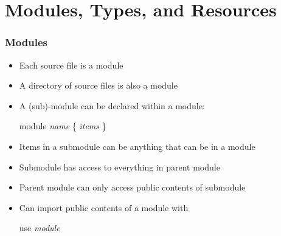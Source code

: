 \documentclass[12pt]{beamer}
\begin{document}
\section{Modules, Types, and Resources}

\begin{frame}[fragile]
\frametitle{Modules}
\begin{itemize}
\item Each source file is a module
\item A directory of source files is also a module
\item A (sub)-module can be declared within a module: \\[-1ex]
  \begin{minipage}{0.95\linewidth}
    \begin{block}{}
\begin{semiverbatim}
module \emph{name} \{
    \emph{items}
\}
\end{semiverbatim}
    \end{block}
  \end{minipage}
\item Items in a submodule can be anything that can be in a module
\item Submodule has access to everything in parent module
\item Parent module can only access public contents of submodule
\item Can import public contents of a module with \\[-1ex]
  \begin{minipage}{0.95\linewidth}
    \begin{block}{}
\begin{semiverbatim}
use \emph{module}
\end{semiverbatim}
    \end{block}
  \end{minipage}
\end{itemize}
\end{frame}
\end{document}
